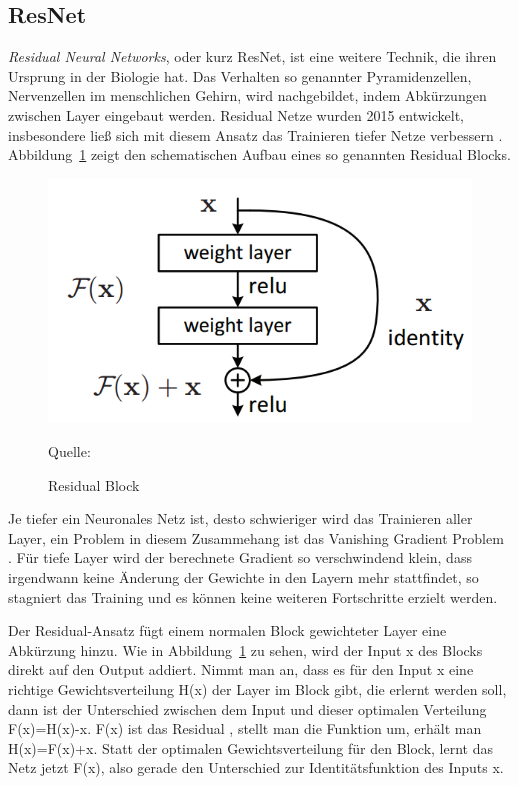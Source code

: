 \subsection{ResNet}
\textit{Residual Neural Networks}, oder kurz ResNet, ist eine weitere Technik, die ihren Ursprung in der Biologie hat. Das Verhalten so genannter Pyramidenzellen, Nervenzellen im menschlichen Gehirn, wird nachgebildet, indem Abkürzungen zwischen Layer eingebaut werden. Residual Netze wurden 2015 entwickelt, insbesondere ließ sich mit diesem Ansatz das Trainieren tiefer Netze verbessern \cite{DBLP:journals/corr/HeZRS15}. Abbildung~\ref{img:ResBlock} zeigt den schematischen Aufbau eines so genannten Residual Blocks. 

\begin{figure}[h]
	\centering
	\includegraphics[scale=0.5]{figures/ResidualBlock.png}
	\caption{Residual Block}
	Quelle: 
	\label{img:ResBlock}
\end{figure}

Je tiefer ein Neuronales Netz ist, desto schwieriger wird das Trainieren aller Layer, ein Problem in diesem Zusammehang ist das \glqq Vanishing Gradient Problem \grqq{}. Für tiefe Layer wird der berechnete Gradient so verschwindend klein, dass irgendwann keine Änderung der Gewichte in den Layern mehr stattfindet, so stagniert das Training und es können keine weiteren Fortschritte erzielt werden.

Der Residual-Ansatz fügt einem normalen Block gewichteter Layer eine Abkürzung hinzu. Wie in Abbildung~\ref{img:ResBlock} zu sehen, wird der Input x des Blocks direkt auf den Output addiert. Nimmt man an, dass es für den Input x eine richtige Gewichtsverteilung H(x) der Layer im Block gibt, die erlernt werden soll, dann ist der Unterschied zwischen dem Input und dieser optimalen Verteilung F(x)=H(x)-x. F(x) ist das \glqq Residual \grqq{}, stellt man die Funktion um, erhält man H(x)=F(x)+x. Statt der optimalen Gewichtsverteilung für den Block, lernt das Netz jetzt F(x), also gerade den Unterschied zur Identitätsfunktion des Inputs x.

